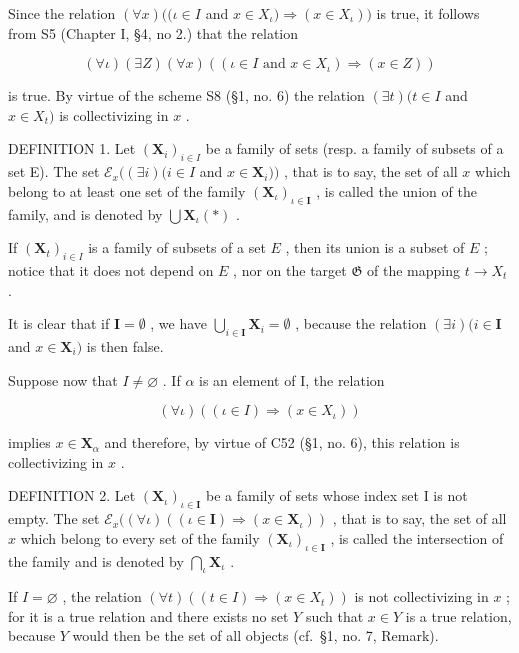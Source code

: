 Since the relation \((\forall x)((\iota \in I\) and \(x\in X_{\iota})\Longrightarrow (x\in X_{\iota}))\) is true, it follows from S5 (Chapter I, §4, no 2.) that the relation

\[
(\forall \iota) (\exists Z) (\forall x) ((\iota \in I \text { and } x \in X _ {\iota}) \Longrightarrow (x \in Z))
\]

is true. By virtue of the scheme S8 (§1, no. 6) the relation \((\exists t)(t \in I\) and \(x \in X_t)\) is collectivizing in \(x\) .

DEFINITION 1. Let \((\mathbf{X}_i)_{i\in I}\) be a family of sets (resp. a family of subsets of a set E). The set \(\mathcal{E}_x((\exists i)(i\in I\) and \(x\in \mathbf{X}_i))\) , that is to say, the set of all \(x\) which belong to at least one set of the family \((\mathbf{X}_{\iota})_{\iota \in \mathbf{I}}\) , is called the union of the family, and is denoted by \(\bigcup \mathbf{X}_{\iota}(*)\) .

If \((\mathbf{X}_t)_{i\in I}\) is a family of subsets of a set \(E\) , then its union is a subset of \(E\) ; notice that it does not depend on \(E\) , nor on the target \(\mathfrak{G}\) of the mapping \(t\to X_t\) .

It is clear that if \(\mathbf{I} = \emptyset\) , we have \(\bigcup_{i \in \mathbf{I}} \mathbf{X}_i = \emptyset\) , because the relation \((\exists i)(i \in \mathbf{I}\) and \(x \in \mathbf{X}_i)\) is then false.

Suppose now that \(I \neq \varnothing\) . If \(\alpha\) is an element of I, the relation

\[
(\forall \iota) ((\iota \in I) \Longrightarrow (x \in X _ {\iota}))
\]

implies \(x \in \mathbf{X}_{\alpha}\) and therefore, by virtue of C52 (§1, no. 6), this relation is collectivizing in \(x\) .

DEFINITION 2. Let \((\mathbf{X}_{\iota})_{\iota \in \mathbf{I}}\) be a family of sets whose index set I is not empty. The set \(\mathcal{E}_x((\forall \iota)((\iota \in \mathbf{I}) \Longrightarrow (x \in \mathbf{X}_{\iota}))\) , that is to say, the set of all \(x\) which belong to every set of the family \((\mathbf{X}_{\iota})_{\iota \in \mathbf{I}}\) , is called the intersection of the family and is denoted by \(\bigcap_{\iota} \mathbf{X}_{\iota}\) .

If \(I = \varnothing\) , the relation \((\forall t)((t \in I) \Longrightarrow (x \in X_t))\) is not collectivizing in \(x\) ; for it is a true relation and there exists no set \(Y\) such that \(x \in Y\) is a true relation, because \(Y\) would then be the set of all objects (cf.~§1, no. 7, Remark).

